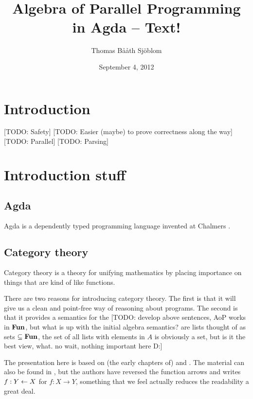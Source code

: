 \documentclass{article}
\begin{document}
\title{Algebra of Parallel Programming in Agda -- Text!}
\author{Thomas B\aa\aa th Sj\"{o}blom}
\date{September 4, 2012}
\maketitle
\section{Introduction}
[TODO: Safety]
[TODO: Easier (maybe) to prove correctness along the way]
[TODO: Parallel]
[TODO: Parsing]
\section{Introduction stuff}
\subsection{Agda}
Agda is a dependently typed programming language invented at Chalmers \cite{norell_agda_invented_2007}.
\subsection{Category theory}
Category theory is a theory for unifying mathematics by placing importance on things that are kind of like functions.

There are two reasons for introducing category theory. 
The first is that it will give us a clean and point-free way of reasoning about programs.
The second is that it provides a semantics for the 
[TODO: develop above sentences, AoP works in $\mathbf{Fun}$, but what is up with the initial algebra semantics? are lists thought of as sets $\subseteq \mathbf{Fun}$, the set of all lists with elements in $A$ is obviously a set, but is it the best view, what. no wait, nothing important here D:]

The presentation here is based on (the early chapters of) \cite{Awodey} and \cite{MacLane}. The material can also be found in \cite{AoP}, but the authors have reversed the function arrows and writes $f : Y \leftarrow X$ for $f : X \to Y$, something that we feel actually reduces the readability a great deal.

\end{document}
